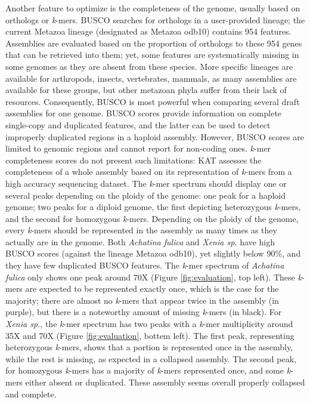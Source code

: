 Another feature to optimize is the completeness of the genome, usually based on orthologs or \textit{k}-mers. BUSCO \cite{busco_evaluation} searches for orthologs in a user-provided lineage; the current Metazoa lineage (designated as Metazoa odb10) contains 954 features. Assemblies are evaluated based on the proportion of orthologs to these 954 genes that can be retrieved into them; yet, some features are systematically missing in some genomes as they are absent from these species. More specific lineages are available for arthropods, insects, vertebrates, mammals, as many assemblies are available for these groups, but other metazoan phyla suffer from their lack of resources. Consequently, BUSCO is most powerful when comparing several draft assemblies for one genome. BUSCO scores provide information on complete single-copy and duplicated features, and the latter can be used to detect improperly duplicated regions in a haploid assembly. However, BUSCO scores are limited to genomic regions and cannot report for non-coding ones. \textit{k}-mer completeness scores do not present such limitations: KAT assesses the completeness of a whole assembly based on its representation of \textit{k}-mers from a high accuracy sequencing dataset. The \textit{k}-mer spectrum should display one or several peaks depending on the ploidy of the genome: one peak for a haploid genome; two peaks for a diploid genome, the first depicting heterozygous \textit{k}-mers, and the second for homozygous \textit{k}-mers. Depending on the ploidy of the genome, every \textit{k}-mers should be represented in the assembly as many times as they actually are in the genome. Both \textit{Achatina fulica} and \textit{Xenia sp.} have high BUSCO scores (against the lineage Metazoa odb10), yet slightly below 90\%, and they have few duplicated BUSCO features. The \textit{k}-mer spectrum of \textit{Achatina fulica} only shows one peak around 70X (Figure \ref{fig:evaluation}, top left). These \textit{k}-mers are expected to be represented exactly once, which is the case for the majority; there are almost no \textit{k}-mers that appear twice in the assembly (in purple), but there is a noteworthy amount of missing \textit{k}-mers (in black). For \textit{Xenia sp.}, the \textit{k}-mer spectrum has two peaks with a \textit{k}-mer multiplicity around 35X and 70X (Figure \ref{fig:evaluation}, bottem left). The first peak, representing heterozygous \textit{k}-mers, shows that a portion is represented once in the assembly, while the rest is missing, as expected in a collapsed assembly. The second peak, for homozygous \textit{k}-mers has a majority of \textit{k}-mers represented once, and some \textit{k}-mers either absent or duplicated. These assembly seems overall properly collapsed and complete. \\


